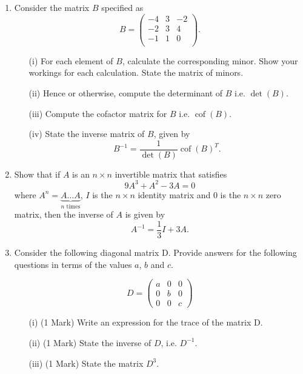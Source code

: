 \documentclass[a4paper,12pt]{article}
\begin{document}
\begin{enumerate}
\item Consider the matrix $B$ specified as
\begin{equation*}
B=\left( \begin{array}{rrr}
-4  &  3  & -2 \\
-2 &   3 &   4\\
-1 &   1  &  0\\
\end{array} \right).
\end{equation*}
\begin{itemize}
\item[(i)]  For each element of $B$, calculate the corresponding minor. Show your workings for each calculation. 
State the matrix of minors.
\item[(ii)]  Hence or otherwise, compute the determinant of $B$ i.e. $\det(B)$.
\item[(iii)]  Compute the cofactor matrix for $B$ i.e. $\operatorname{cof}(B)$.
\item[(iv)]  State the inverse matrix of $B$, given by
\[ B^{-1}=\frac{1}{\det(B)}  \operatorname{cof}(B)^T. \]
\end{itemize}
\item Show that if $A$ is an $n\times n$ invertible matrix that satisfies 
$$
9A^3+A^2-3A=0
$$
where $A^n=\underbrace{A\ldots A}_{\textrm{$n$ times}}$, %
$I$ is the $n\times n$  identity matrix and $0$ is the $n\times n$  zero matrix,
then the inverse of $A$ is given by  %
$$
A^{-1}=\frac13I+3A.
$$
\item 
Consider the following diagonal matrix D. Provide answers for the following questions in terms of the values $a$, $b$ and $c$.


\[D = \left(\begin{array}{ccc}
a & 0 & 0 \\ 
0 & b & 0 \\ 
0 & 0 & c
\end{array} \right)\]
\begin{itemize}
\item[(i)] (1 Mark) Write an expression for the trace of the matrix D.
\item[(ii)] (1 Mark) State the inverse of $D$, i.e. $D^{-1}$.
\item[(iii)] (1 Mark) State the matrix $D^3$.
\end{itemize}
\smallskip
\end{enumerate}
\end{document}
